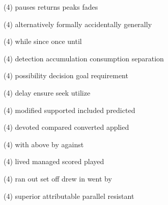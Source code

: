 \item
\begin{tasks}(4)
	\task pauses
	\task returns
	\task peaks
	\task fades
\end{tasks}
\item
\begin{tasks}(4)
	\task alternatively
	\task formally
	\task accidentally
	\task generally
\end{tasks}
\item
\begin{tasks}(4)
	\task while
	\task since
	\task once
	\task until
\end{tasks}
\item
\begin{tasks}(4)
	\task detection
	\task accumulation
	\task consumption
	\task separation
\end{tasks}
\item
\begin{tasks}(4)
	\task possibility
	\task decision
	\task goal
	\task requirement
\end{tasks}
\item
\begin{tasks}(4)
	\task delay
	\task ensure
	\task seek
	\task utilize
\end{tasks}
\item
\begin{tasks}(4)
	\task modified
	\task supported
	\task included
	\task predicted
\end{tasks}
\item
\begin{tasks}(4)
	\task devoted
	\task compared
	\task converted
	\task applied
\end{tasks}
\item
\begin{tasks}(4)
	\task with
	\task above
	\task by
	\task against
\end{tasks}
\item
\begin{tasks}(4)
	\task lived
	\task managed
	\task scored
	\task played
\end{tasks}
\item
\begin{tasks}(4)
	\task ran out
	\task set off
	\task drew in
	\task went by
\end{tasks}
\item
\begin{tasks}(4)
	\task superior
	\task attributable
	\task parallel
	\task resistant
\end{tasks}
\item
